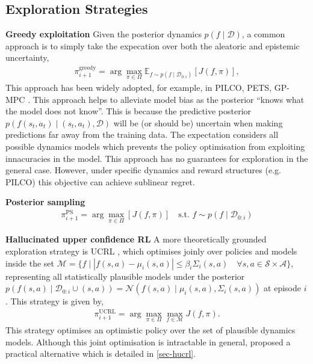 \documentclass{article}
\newcommand{\dataset}{\ensuremath{\mathcal{D}}}
\newcommand{\policyDomain}{\ensuremath{\Pi}}
\newcommand{\transitionFn}{\ensuremath{f}}
\newcommand{\policy}{\ensuremath{\pi}}
\begin{document}
\subsection{Exploration Strategies}
\textbf{Greedy exploitation}
Given the posterior dynamics \(p(\transitionFn \mid \mathcal{D})\),
a common approach is to simply take the expecation over both the aleatoric and epistemic uncertainty,
\begin{align} \label{eq-greedy}
\policy_{i+1}^{\text{greedy}} = \arg \max_{\policy \in \policyDomain} \mathbb{E}_{\transitionFn \sim p(\transitionFn \mid \dataset_{0:i})} \left[ J(\transitionFn, \policy) \right],
\end{align}
This approach has been widely adopted, for example, in PILCO, PETS, GP-MPC
\cite{deisenrothPILCO2011,chuaDeepReinforcementLearning2018,kamtheDataEfficient2018}.
This approach helps to alleviate model bias as the posterior ``knows what the model does not know''.
This is because the predictive posterior \(p(f(s_{t},a_{t}) \mid (s_{t},a_{t}),  \mathcal{D} )\) will be (or should be) uncertain when making
predictions far away from the training data.
The expectation considers all possible dynamics models which prevents the policy optimisation from
exploiting innacuracies in the model.
This approach has no guarantees for exploration in the general case.
However, under specific dynamics and reward structures (e.g. PILCO) this objective can achieve sublinear regret.


\textbf{Posterior sampling}
\cite{osbandWhyPosteriorSampling2017,osbandMoreEfficientReinforcement2013}
\begin{align} \label{eq-posterior-sampling}
\policy_{i+1}^{\text{PS}} = \arg \max_{\policy \in \policyDomain} \left[ J(\transitionFn, \policy) \right] \quad \text{s.t. } \transitionFn \sim p(\transitionFn \mid \dataset_{0:i})
\end{align}

\textbf{Hallucinated upper confidence RL}
A more theoretically grounded exploration strategy is UCRL \autocite{jakschNearoptimal2010}, which optimises joinly over
policies and models inside the set
\(\mathcal{M} = \{ f \mid | f(s,a) - \mu_{i}(s, a) | \leq \beta_{i} \Sigma_{i}(s, a) \quad \forall s, a \in \mathcal{S} \times \mathcal{A} \}\), representing all statistically plausible
models under the posterior \(p(f(s,a) \mid \mathcal{D}_{0:i} \cup (s,a)) = \mathcal{N}(f(s,a) \mid \mu_{i}(s,a), \Sigma_{i}(s,a))\) at episode \(i\).
This strategy is given by,
\begin{align} \label{eq-ucrl}
\policy_{i+1}^{\text{UCRL}} = \arg \max_{\policy \in \policyDomain} \max_{\transitionFn \in \mathcal{M}} J(\transitionFn, \policy).
\end{align}
This strategy optimises an optimistic policy over the set of plausible dynamics models.
Although this joint optimisation is intractable in general,
\cite{curiEfficient2020} proposed a practical alternative which is detailed in \cref{sec-hucrl}.
\end{document}
